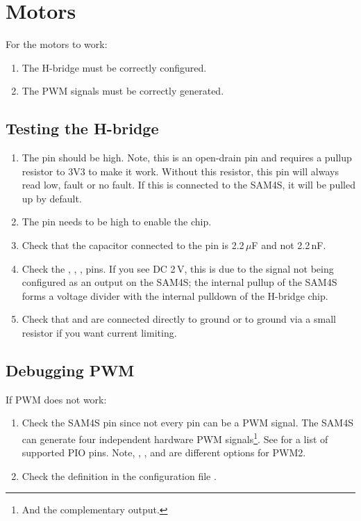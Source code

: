 \section{Motors}
\label{motors-testing}

For the motors to work:
%
\begin{enumerate}
\item The H-bridge must be correctly configured.
\item The PWM signals must be correctly generated.
\end{enumerate}


\subsection{Testing the H-bridge}
\label{testing-the-h-bridge}

\begin{enumerate}
\item The  pin should be high.  Note, this is an
  open-drain pin and requires a pullup resistor to 3V3 to make it
  work.  Without this resistor, this pin will always read low, fault
  or no fault.  If this is connected to the SAM4S, it will be pulled
  up by default.

\item The  pin needs to be high to enable the chip.

\item Check that the capacitor connected to the  pin is
  2.2\,$\mu$F and not 2.2\,nF.

\item Check the , , ,  pins.
  If you see DC 2\,V, this is due to the signal not being configured
  as an output on the SAM4S; the internal pullup of the SAM4S forms a
  voltage divider with the internal pulldown of the H-bridge chip.

\item Check that  and  are connected
  directly to ground or to ground via a small resistor if you want
  current limiting.
\end{enumerate}


\subsection{Debugging PWM}
\label{debugging-pwm}

If PWM does not work:

\begin{enumerate}
\item
  Check the SAM4S pin since not every pin can be a PWM signal.  The
  SAM4S can generate four independent hardware PWM
  signals\footnote{And the complementary output.}. See
   for a list of supported PIO pins.  Note,
  , , and  are different options for
  PWM2.

\item
  Check the definition in the configuration file .
\end{enumerate}

